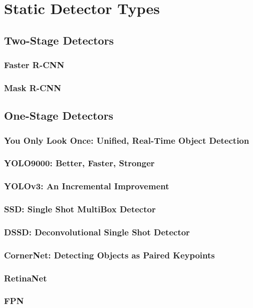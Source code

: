 \documentclass[12pt, letterpaper, twoside]{article}
\begin{document}
\section{Static Detector Types}
\subsection{Two-Stage Detectors}
\subsubsection{Faster R-CNN}
\subsubsection{Mask R-CNN}

\subsection{One-Stage Detectors}
\subsubsection{You Only Look Once: Unified, Real-Time Object Detection}
\subsubsection{YOLO9000: Better, Faster, Stronger}
\subsubsection{YOLOv3: An Incremental Improvement}
\subsubsection{SSD: Single Shot MultiBox Detector}
\subsubsection{DSSD: Deconvolutional Single Shot Detector}
\subsubsection{CornerNet: Detecting Objects as Paired Keypoints}
\subsubsection{RetinaNet}
\subsubsection{FPN}
\end{document}
